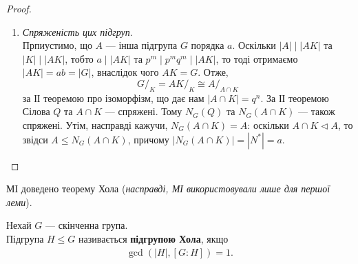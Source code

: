 \documentclass{math_library}
\begin{document}
\begin{proof}
\begin{enumerate}[topsep=0pt,wide=0pt,label={\roman*.}]
\begin{itemize}
\item $Z(K) = \{e\}$.\\
!Припустимо, що $Z(K)$ --- нетривіальна група. Оскільки $Z(K) \charac K$ та $K \triangleleft G$, то звідси $Z(K) \triangleleft G$. Тоді $H \leq Z(K)$, як найменша нормальна підгрупа для $G$. Доведемо нижче, що $Q \charac K$, тоді оскільки $K \triangleleft G$, то одержимо $Q \triangleleft G$. Значить, $H \leq Q$ як найменша нормальна підгрупа для $G$ --- суперечність!\\
Отже, маємо $K = HQ$. Зауважимо, що $H \charac K$, оскільки $\gcd(|H|, [K:H]) = 1$ та $H \triangleleft K$. Тепер розглянемо автоморфізм $\varphi \colon K \to K$, звідси $\varphi(K) = \varphi(HQ) = \varphi(H) \varphi(Q) = H \varphi(Q)$. Крім того, $H \cap \varphi(Q) = \varphi(H) \cap \varphi(Q) = \varphi(H \cap Q) = \varphi(\{e\}) = \{e\}$. Отже, $|\varphi(Q)| = q^n$, тобто $\varphi(Q)$ також буде $q$-підгрупою Сілова для $K$. Звідси $\varphi(Q) = xQx^{-1}$, причому $x = hq$. Оскільки $H \leq Z(K)$, то елемент $h$ комутує з будь-яким елементом з $Q$, внаслідок чого $\varphi(Q) = Q$. Це й доводить, що $Q \charac K$.
\end{itemize}
Разом одержимо, що $|H \cap N| \leq |Z(K)| = 1$, тому одержимо бажане $|N^*| = a$.

\item \textit{Спряженість цих підгруп}.\\
Прпиустимо, що $A$ --- інша підгрупа $G$ порядка $a$. Оскільки $|A| \mid |AK|$ та $|K| \mid |AK|$, тобто $a \mid |AK|$ та $p^m \mid p^m q^m \mid |AK|$, то тоді отримаємо $|AK| = ab = |G|$, внаслідок чого $AK = G$. Отже,
\[
G/_K = AK/_K \cong A/_{A \cap K}
\]
за ІІ теоремою про ізоморфізм, що дає нам $|A\cap K| = q^n$. За ІІ теоремою Сілова $Q$ та $A \cap K$ --- спряжені. Тому $N_G(Q)$ та $N_G(A \cap K)$ --- також спряжені. Утім, насправді кажучи, $N_G(A \cap K) = A$: оскільки $A \cap K \triangleleft A$, то звідси $A \leq N_G(A \cap K)$, причому $|N_G(A \cap K)| = |N^*| = a$. \qedhere
\end{enumerate}
\end{proof}

МІ доведено теорему Хола (\textit{насправді, МІ використовували лише для першої леми}).

\begin{definition}
Нехай $G$ --- скінченна група.\\
Підгрупа $H \leq G$ називається \textbf{підгрупою Хола}, якщо 
\begin{align*}
\gcd(|H|, [G:H]) = 1.
\end{align*}
\end{definition}
\end{document}
